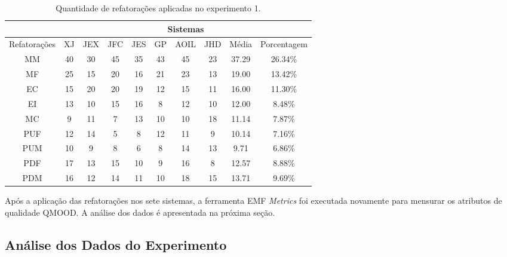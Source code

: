 \begin{table}[h]
\centering
\caption{Quantidade de refatorações aplicadas no experimento 1.}
\label{tab:experimento_dados_refatoracoes_aplicadas}
\begin{tabular}{c|c|c|c|c|c|c|c|c|c|}
\cline{2-10}
                                   & \multicolumn{9}{c|}{Sistemas}                                \\ \hline
\multicolumn{1}{|c|}{Refatorações} & XJ & JEX & JFC & JES & GP & AOIL & JHD & Média & Porcentagem \\ \hline
\multicolumn{1}{|c|}{MM}           & 40 & 30  & 45  & 35  & 43 & 45   & 23  & 37.29 & 26.34\%     \\ \hline
\multicolumn{1}{|c|}{MF}           & 25 & 15  & 20  & 16  & 21 & 23   & 13  & 19.00 & 13.42\%     \\ \hline
\multicolumn{1}{|c|}{EC}           & 15 & 20  & 20  & 19  & 12 & 15   & 11  & 16.00 & 11.30\%     \\ \hline
\multicolumn{1}{|c|}{EI}           & 13 & 10  & 15  & 16  & 8  & 12   & 10  & 12.00 & 8.48\%      \\ \hline
\multicolumn{1}{|c|}{MC}           & 9  & 11  & 7   & 13  & 10 & 10   & 18  & 11.14 & 7.87\%      \\ \hline
\multicolumn{1}{|c|}{PUF}          & 12 & 14  & 5   & 8   & 12 & 11   & 9   & 10.14 & 7.16\%      \\ \hline
\multicolumn{1}{|c|}{PUM}          & 10 & 9   & 8   & 6   & 8  & 14   & 13  & 9.71  & 6.86\%     \\ \hline
\multicolumn{1}{|c|}{PDF}          & 17 & 13  & 15  & 10  & 9  & 16   & 8   & 12.57 & 8.88\%      \\ \hline
\multicolumn{1}{|c|}{PDM}          & 16 & 12  & 14  & 11  & 10 & 18   & 15  & 13.71 & 9.69\%      \\ \hline
\end{tabular}
\end{table}


Após a aplicação das refatorações nos sete sistemas, a ferramenta EMF \textit{Metrics} foi executada novamente para mensurar os atributos de qualidade QMOOD. A análise dos dados é apresentada na próxima seção.

\subsection{Análise dos Dados do Experimento}

